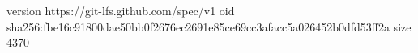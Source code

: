 version https://git-lfs.github.com/spec/v1
oid sha256:fbe16c91800dae50bb0f2676ec2691e85ce69cc3afacc5a026452b0dfd53ff2a
size 4370
